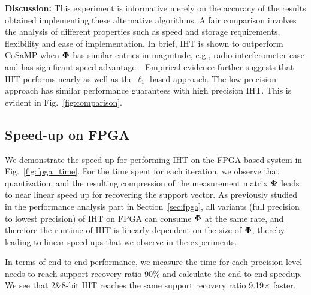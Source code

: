 \documentclass{article}
\begin{document}
{{\bf Discussion:} This experiment is informative merely on the accuracy of the results obtained implementing these alternative algorithms. A fair comparison involves the analysis of different properties such as speed and storage requirements, flexibility and ease of implementation. In brief, 
IHT is shown to outperform CoSaMP when ${\bf \Phi}$ has similar entries in magnitude, e.g., radio interferometer case and has significant speed advantage~\cite{blumensath2012greedy}. Empirical evidence further suggests that IHT performs nearly as well as the $\ell_1$-based approach. %
The low precision approach has similar performance guarantees with high precision IHT. This is evident in Fig.~\ref{fig:comparison}.



\vspace{-1em}
\subsection{Speed-up on FPGA}
\vspace{-0.5em}

We demonstrate the speed up for performing IHT on the FPGA-based system in Fig.~\ref{fig:fpga_time}. For the time spent for each iteration, we observe that quantization, and the resulting compression of the measurement matrix ${\bf \Phi}$ leads to near linear speed up for recovering the support vector. As previously studied in the performance analysis part in Section~\ref{sec:fpga}, all variants (full precision to lowest precision) of IHT on FPGA can consume ${\bf \Phi}$ at the same rate, and therefore the runtime of IHT is linearly dependent on the size of ${\bf \Phi}$, thereby leading to linear speed ups that we observe in the experiments.

In terms of end-to-end performance, we measure the time for
each precision level needs to reach support recovery
ratio 90\% and calculate the end-to-end speedup. We see 
that 2\&8-bit IHT reaches the same support recovery
ratio 9.19$\times$ faster.



}
\end{document}
